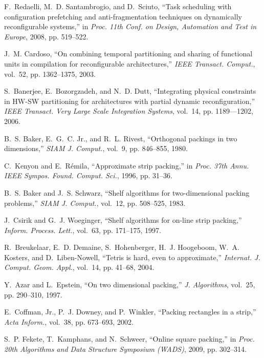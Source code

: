 \documentclass[10pt,journal]{IEEEtran}
\begin{document}
\begin{thebibliography}{10}
F.~Redaelli, M.~D. Santambrogio, and D.~Sciuto, ``Task scheduling with
  configuration prefetching and anti-fragmentation techniques on dynamically
  reconfigurable systems,'' in \emph{Proc. 11th Conf. on Design, Automation and
  Test in Europe}, 2008, pp. 519--522.

J.~M. Cardoso, ``On combining temporal partitioning and sharing of functional
  units in compilation for reconfigurable architectures,'' \emph{IEEE Transact.
  Comput.}, vol.~52, pp. 1362--1375, 2003.

S.~Banerjee, E.~Bozorgzadeh, and N.~D. Dutt, ``Integrating physical constraints
  in {HW-SW} partitioning for architectures with partial dynamic
  reconfiguration,'' \emph{IEEE Transact. Very Large Scale Integration
  Systems}, vol.~14, pp. 1189--–1202, 2006.

B.~S. Baker, E.~G.~C. Jr., and R.~L. Rivest, ``Orthogonal packings in two
  dimensions,'' \emph{SIAM J. Comput.}, vol.~9, pp. 846--855, 1980.

C.~Kenyon and E.~R{\'e}mila, ``Approximate strip packing,'' in \emph{Proc. 37th
  Annu. IEEE Sympos. Found. Comput. Sci.}, 1996, pp. 31--36.

B.~S. Baker and J.~S. Schwarz, ``Shelf algorithms for two-dimensional packing
  problems,'' \emph{SIAM J. Comput.}, vol.~12, pp. 508--525, 1983.

J.~Csirik and G.~J. Woeginger, ``Shelf algorithms for on-line strip packing,''
  \emph{Inform. Process. Lett.}, vol.~63, pp. 171--175, 1997.

R.~Breukelaar, E.~D. Demaine, S.~Hohenberger, H.~J. Hoogeboom, W.~A. Kosters,
  and D.~Liben-Nowell, ``Tetris is hard, even to approximate,'' \emph{Internat.
  J. Comput. Geom. Appl.}, vol.~14, pp. 41--68, 2004.

Y.~Azar and L.~Epstein, ``On two dimensional packing,'' \emph{J. Algorithms},
  vol.~25, pp. 290--310, 1997.

E.~{Coffman, Jr.}, P.~J. Downey, and P.~Winkler, ``Packing rectangles in a
  strip,'' \emph{Acta Inform.}, vol.~38, pp. 673--693, 2002.

S.~P. Fekete, T.~Kamphans, and N.~Schweer, ``Online square packing,'' in
  \emph{Proc. 20th Algorithms and Data Structure Symposium (WADS)}, 2009, pp.
  302--314.

\end{thebibliography}
\end{document}
